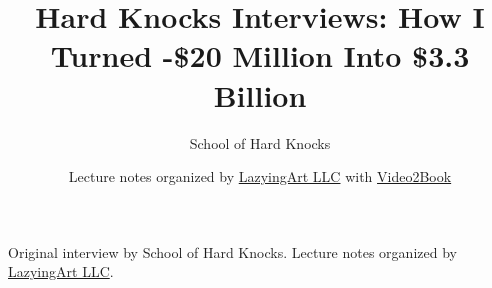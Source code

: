 \documentclass[11pt,oneside]{book}
\begin{document}
\frontmatter
\title{Hard Knocks Interviews: How I Turned -\$20 Million Into \$3.3 Billion}
\author{School of Hard Knocks}
\date{Lecture notes organized by \href{https://lazying.art}{LazyingArt LLC} with \href{https://github.com/lachlanchen/Video2Book}{Video2Book}}
\maketitle
\begin{center}
\small Original interview by School of Hard Knocks. Lecture notes organized by \href{https://lazying.art}{LazyingArt LLC}.
\end{center}
\clearpage
\mainmatter

\end{document}

